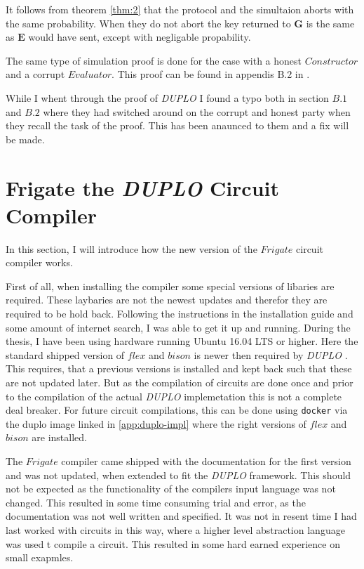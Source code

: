 \documentclass[twoside,11pt,openright]{report}
\newcommand{\DUPLO}{\textit{DUPLO} }
\begin{document}
It follows from theorem \ref{thm:2} that the protocol and the simultaion aborts with the same probability. When they do not abort the key returned to $\mathbf{G}$ is the same as $\mathbf{E}$ would have sent, except with negligable propability.

The same type of simulation proof is done for the case with a honest $Constructor$ and a corrupt $Evaluator$. This proof can be found in appendis B.2 in .

\bigskip

While I whent through the proof of \DUPLO I found a typo both in section $B.1$ and $B.2$ where they had switched around on the corrupt and honest party when they recall the task of the proof.  This has been anaunced to them and a fix will be made.


\section{Frigate the \DUPLO Circuit Compiler}
\label{sec:frigate}
In this section, I will introduce how the new version of the $Frigate$ circuit compiler works.

First of all, when installing the compiler some special versions of libaries are required. These laybaries are not the newest updates and therefor they are required to be hold back. Following the instructions in the installation guide and some amount of internet search, I was able to get it up and running. During the thesis, I have been using hardware running Ubuntu 16.04 LTS or higher. Here the standard shipped version of $flex$ and $bison$ is newer then required by \DUPLO. This requires, that a previous versions is installed and kept back such that these are not updated later. But as the compilation of circuits are done once and prior to the compilation of the actual \DUPLO implemetation this is not a complete deal breaker. For future circuit compilations, this can be done using \verb|docker| via the duplo image linked in \ref{app:duplo-impl} where the right versions of $flex$ and $bison$ are installed.

The $Frigate$ compiler came shipped with the documentation for the first version and was not updated, when extended to fit the \DUPLO framework. This should not be expected as the functionality of the compilers input language was not changed. This resulted in some time consuming trial and error, as the documentation was not well written and specified. It was not in resent time I had last worked with circuits in this way, where a higher level abstraction language was used t compile a circuit. This resulted in some hard earned experience on small exapmles. 
\end{document}
